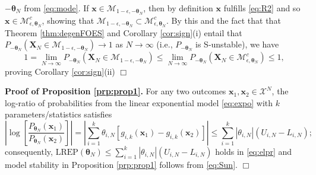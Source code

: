 \documentclass[]{article}
\theoremstyle{definition}
\newcommand{\REP}{\mathrm{LREP}}
\begin{document}
\(-\boldsymbol \theta_N\) from \eqref{eq:mode}. If
\(\boldsymbol x \in\mathcal{M}_{1-\epsilon, -\boldsymbol \theta_N}\),
then by definition \(\boldsymbol x\) fulfills \eqref{eq:R2} and so
\(\boldsymbol x \in \mathcal{M}_{\epsilon, \boldsymbol \theta_N}^c\),
showing that
\(\mathcal{M}_{1-\epsilon, -\boldsymbol \theta_N} \subset \mathcal{M}_{\epsilon, \boldsymbol \theta_N}^c\).
By this and the fact that that Theorem \ref{thm:degenFOES} and Corollary
\ref{cor:sign}(i) entail that
\(P_{-\boldsymbol \theta_N}(\boldsymbol X_N \in \mathcal{M}_{1-\epsilon, -\boldsymbol \theta_N})\to 1\)
as \(N\to \infty\) (i.e., \(P_{-\boldsymbol \theta_N}\) is S-unstable),
we have \[
1  = \lim_{N\to \infty} P_{-\boldsymbol \theta_N}(\boldsymbol X_N \in \mathcal{M}_{1-\epsilon, -\boldsymbol \theta_N}) \leq \lim_{N\to \infty} P_{-\boldsymbol \theta_N}(\boldsymbol X_N \in \mathcal{M}_{\epsilon, \boldsymbol \theta_N}^c ) \leq 1,
\] proving Corollary \ref{cor:sign}(ii) \hfill \(\Box\)

\textbf{Proof of Proposition \ref{prp:prop1}.} For any two outcomes
\(\boldsymbol x_1, \boldsymbol x_2\in\mathcal{X}^N\), the log-ratio of
probabilities from the linear exponential model \eqref{eq:expo} with \(k\)
parameters/statistics satisfies \[
\left|\log \left[ \frac{P_{\boldsymbol \theta_N}(\boldsymbol x_1)}{P_{\boldsymbol \theta_N}(\boldsymbol x_2)}  \right] \right| =
\left|  \sum_{i=1}^k \theta_{i,N} [g_{i,k}(\boldsymbol x_1) - g_{i,k}(\boldsymbol x_2) ] \right|  \leq  \sum_{i=1}^k | \theta_{i,N}| (U_{i,N}-L_{i,N});
\] consequently,
\(\REP(\boldsymbol \theta_N ) \leq \sum_{i=1}^k | \theta_{i,N}| (U_{i,N}-L_{i,N})\)
holds in \eqref{eq:elpr} and model stability in Proposition
\ref{prp:prop1} follows from \eqref{eq:Sun}. \hfill \(\Box\)
\end{document}
